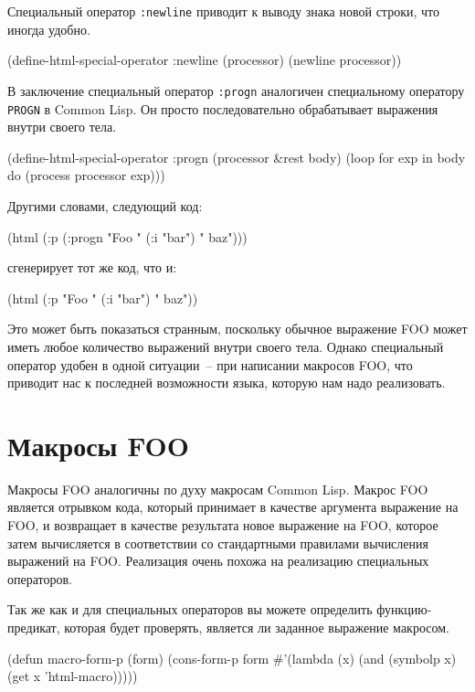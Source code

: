 Специальный оператор \lstinline{:newline} приводит к выводу знака новой строки, что иногда удобно.

\begin{myverb}
(define-html-special-operator :newline (processor)
  (newline processor))
\end{myverb}

В заключение специальный оператор \lstinline{:progn} аналогичен специальному оператору
\lstinline{PROGN} в Common Lisp.  Он просто последовательно обрабатывает выражения внутри
своего тела.

\begin{myverb}
(define-html-special-operator :progn (processor &rest body)
  (loop for exp in body do (process processor exp)))
\end{myverb}

Другими словами, следующий код:

\begin{myverb}
(html (:p (:progn "Foo " (:i "bar") " baz")))
\end{myverb}

сгенерирует тот же код, что и:

\begin{myverb}
(html (:p "Foo " (:i "bar") " baz"))
\end{myverb}

Это может быть показаться странным, поскольку обычное выражение FOO может иметь любое
количество выражений внутри своего тела.  Однако специальный оператор удобен в одной
ситуации~-- при написании макросов FOO, что приводит нас к последней возможности языка,
которую нам надо реализовать.

\section{Макросы FOO}

Макросы FOO аналогичны по духу макросам Common Lisp.  Макрос FOO является отрывком кода,
который принимает в качестве аргумента выражение на FOO, и возвращает в качестве
результата новое выражение на FOO, которое затем вычисляется в соответствии со
стандартными правилами вычисления выражений на FOO.  Реализация очень похожа на реализацию
специальных операторов.

Так же как и для специальных операторов вы можете определить функцию-предикат, которая
будет проверять, является ли заданное выражение макросом.

\begin{myverb}
(defun macro-form-p (form)
  (cons-form-p form #'(lambda (x) (and (symbolp x) (get x 'html-macro)))))
\end{myverb}

